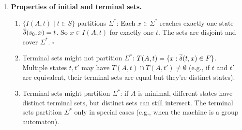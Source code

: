\begin{enumerate}[{3.}1.]
\item \textbf{Properties of initial and terminal sets.}

\begin{enumerate}
\item $\{I(A,t)\mid t\in S\}$ partitions $\Sigma^*$: Each $x\in\Sigma^*$ reaches exactly one state $\overline{\delta}(s_0,x)=t$. So $x\in I(A,t)$ for exactly one $t$. The sets are disjoint and cover $\Sigma^*$. $\square$

\item Terminal sets might not partition $\Sigma^*$: $T(A,t)=\{x:\overline{\delta}(t,x)\in F\}$. Multiple states $t,t'$ may have $T(A,t)\cap T(A,t')\neq\emptyset$ (e.g., if $t$ and $t'$ are equivalent, their terminal sets are equal but they're distinct states).

\item Terminal sets might partition $\Sigma^*$: if $A$ is minimal, different states have distinct terminal sets, but distinct sets can still intersect. The terminal sets partition $\Sigma^*$ only in special cases (e.g., when the machine is a group automaton).
\end{enumerate}

\end{enumerate}
